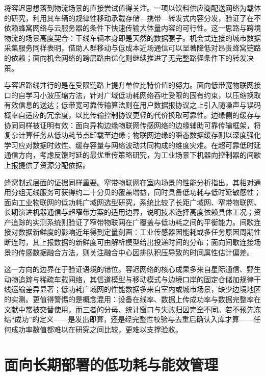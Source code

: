 \documentclass[11pt,a4paper]{article}
\begin{document}
将容迟思想落到物流场景的直接尝试值得关注。一项以饮料供应商配送网络为载体的研究，利用其车辆的规律性移动承载存储—携带—转发式内容分发，验证了在不依赖蜂窝网络与云服务器的条件下快速传输大体量内容的可行性\cite{doiwimob20198923146}。这一思路与跨境物流的场景高度契合：干线车辆本身即是天然的数据骡子。机会式连接的城市数据采集服务同样表明，借助人群移动与低成本近场通信可以显著降低对昂贵蜂窝链路的依赖\cite{doiwfiot20167845498}；面向机会网络的跨层路由优化则继续推进了无完整路径条件下的转发决策\cite{doifi16060183}。

与容迟路线并行的是在受限链路上提升单位比特价值的努力。面向低带宽物联网接口的自学习小波压缩方法，针对广域低功耗网络吞吐受限的固有约束，以压缩换取有效信息的送达\cite{doissci5045120219660160}；低带宽可靠传输算法则在用户数据报协议之上引入随噪声与误码概率自适应的冗余度，以比传输控制协议更轻的代价换取可靠性\cite{doiccwc20177868422}。边缘侧的缓存与协同同样被证明有效：面向异构边缘物联网传感网络的边缘辅助可靠传输框架，将复杂计算任务从低功耗节点卸载至边缘\cite{dois19092078}；物联网边缘的瞬态数据缓存则以深度强化学习应对数据时效性、缓存容量与网络波动共同构成的维度灾难\cite{doilcn5369620229843211}。在超可靠低时延通信方向，考虑反馈时延的最优重传策略研究，为工业场景下机器向控制器的间歇上报提供了资源分配依据\cite{doiglobecom3843720199013987}。

蜂窝制式层面的证据同样重要。窄带物联网在室内场景的性能分析指出，其相对通用分组无线服务可获得约二十分贝的覆盖增益，同时具备低功耗与低时延敏感性\cite{doiicctec201700299}；面向工业物联网的低功耗广域网选型研究，系统比较了长距广域网、窄带物联网、长期演进机器通信与超窄带方案的适用边界，说明技术选择高度依赖具体工况\cite{doi275527212025ld30345}；资产追踪的实测系统则验证了窄带物联网在广覆盖与低功耗之间的平衡能力\cite{dois21113772}。间歇连接对数据新鲜度的影响近年得到定量刻画：工业传感器因能耗或多任务原因周期性断连时，其上报数据的新鲜度可由解析模型给出投递时间的分布\cite{doimetroind40iot66048202511}；面向间歇连接场景的传感数据融合方法，则关注融合中心因排队积压导致的时间属性估计偏差\cite{doiecjse948125}。

这一方向的边界在于验证语境的错位。容迟网络的核心成果多来自星际通信、野生动物追踪与稀疏车载网络，其信道模型与移动模式与边境口岸的固定仓储加规律干线运输差异显著；低功耗广域网的性能数据多来自室内或城市场景，缺少边境地区的实测。更值得警惕的是概念混用：设备在线率、数据上传成功率与数据完整率在文献中常被交替使用，而三者的分母、统计窗口与失败归因完全不同。若不预先冻结“成功”的定义——是发出即算，还是经完整性校验与去重后确认入库才算——任何成功率数值都难以在研究之间比较，更难以支撑验收。

\section{面向长期部署的低功耗与能效管理}
\end{document}
